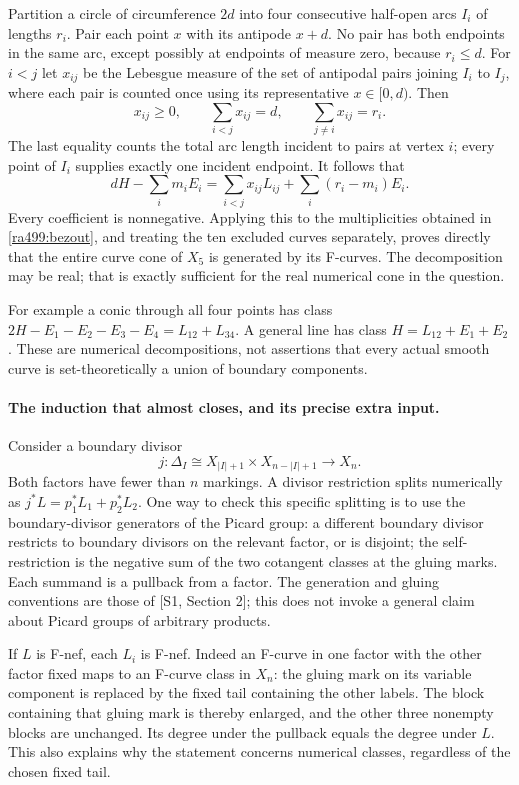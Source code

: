 \documentclass[11pt]{article}
\begin{document}
Partition a circle of circumference $2d$ into four consecutive half-open
arcs $I_i$ of lengths $r_i$. Pair each point $x$ with its antipode $x+d$.
No pair has both endpoints in the same arc, except possibly at endpoints
of measure zero, because $r_i\le d$. For $i<j$ let $x_{ij}$ be the
Lebesgue measure of the set of antipodal pairs joining $I_i$ to $I_j$,
where each pair is counted once using its representative $x\in[0,d)$.
Then
\[
 x_{ij}\ge0,\qquad \sum_{i<j}x_{ij}=d,
 \qquad \sum_{j\ne i}x_{ij}=r_i.
\]
The last equality counts the total arc length incident to pairs at vertex
$i$; every point of $I_i$ supplies exactly one incident endpoint.
It follows that
\begin{equation}\label{ra499:decomposition}
 dH-\sum_i m_iE_i
 =\sum_{i<j}x_{ij}L_{ij}+\sum_i(r_i-m_i)E_i.
\end{equation}
Every coefficient is nonnegative. Applying this to the multiplicities
obtained in \eqref{ra499:bezout}, and treating the ten excluded curves
separately, proves directly that the entire curve cone of $X_5$ is generated
by its F-curves. The decomposition may be real; that is exactly sufficient
for the real numerical cone in the question.

For example a conic through all four points has class
$2H-E_1-E_2-E_3-E_4=L_{12}+L_{34}$.
A general line has class $H=L_{12}+E_1+E_2$.
These are numerical decompositions, not assertions that every actual
smooth curve is set-theoretically a union of boundary components.

\paragraph{The induction that almost closes, and its precise extra input.}
Consider a boundary divisor
\[
 j:\Delta_I\cong X_{|I|+1}\times X_{n-|I|+1}\longrightarrow X_n.
\]
Both factors have fewer than $n$ markings. A divisor restriction splits
numerically as $j^*L=p_1^*L_1+p_2^*L_2$. One way to check this specific
splitting is to use the boundary-divisor generators of the Picard group:
a different boundary divisor restricts to boundary divisors on the relevant
factor, or is disjoint; the self-restriction is the negative sum of the
two cotangent classes at the gluing marks. Each summand is a pullback from
a factor. The generation and gluing conventions are those of [S1,
Section 2]; this does not invoke a general claim about Picard groups of
arbitrary products.

If $L$ is F-nef, each $L_i$ is F-nef. Indeed an F-curve in one factor
with the other factor fixed maps to an F-curve class in $X_n$: the gluing
mark on its variable component is replaced by the fixed tail containing
the other labels. The block containing that gluing mark is thereby
enlarged, and the other three nonempty blocks are unchanged. Its degree
under the pullback equals the degree under $L$. This also explains why
the statement concerns numerical classes, regardless of the chosen fixed
tail.
\end{document}
